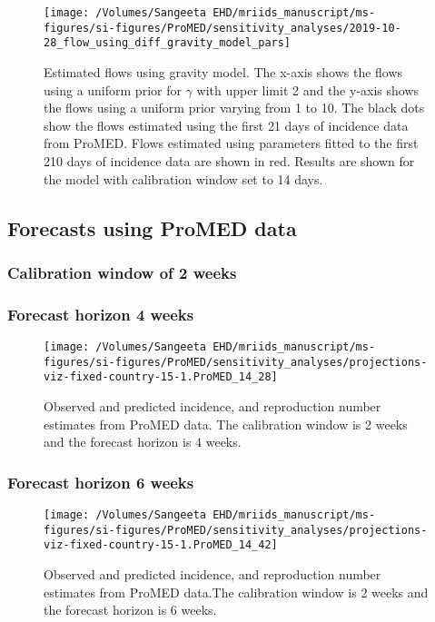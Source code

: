 \documentclass[9pt,twoside,lineno]{pnas-new}
\begin{document}
\begin{figure}
\centering
   \texttt{[image: /Volumes/Sangeeta
     EHD/mriids\_manuscript/ms-figures/si-figures/ProMED/sensitivity\_analyses/2019-10-28\_flow\_using\_diff\_gravity\_model\_pars]}
\caption{Estimated flows using gravity model. The x-axis shows the flows using a uniform
  prior for $\gamma$ with upper limit 2 and the y-axis shows the flows
  using a uniform prior varying from 1 to 10. The black dots show the
  flows estimated using the first 21 days of incidence data from ProMED. Flows
  estimated using parameters fitted to the first 210 days of incidence
  data are shown in red. Results are shown for the model with
  calibration window set to 14 days.}
\label{fig:flows2}
\end{figure}\FloatBarrier

\subsection{Forecasts using ProMED data}\label{forecasts-using-promed-data-1}
\subsubsection{Calibration window of 2 weeks}\label{sec:pm2-3-2}
\subsubsection{Forecast horizon 4 weeks}\label{forecast-horizon-4-weeks-8}

\begin{figure}
  \centering 
\texttt{[image: /Volumes/Sangeeta EHD/mriids\_manuscript/ms-figures/si-figures/ProMED/sensitivity\_analyses/projections-viz-fixed-country-15-1.ProMED\_14\_28]} 
  \caption{Observed and predicted incidence, and reproduction number
estimates from ProMED data. The calibration window is 2 weeks and the
forecast horizon is 4 weeks.}
\label{fig:pm24ul10}
\end{figure}\FloatBarrier


\subsubsection{Forecast horizon 6 weeks}\label{forecast-horizon-6-weeks-9}

\begin{figure}

  \centering \texttt{[image: /Volumes/Sangeeta EHD/mriids\_manuscript/ms-figures/si-figures/ProMED/sensitivity\_analyses/projections-viz-fixed-country-15-1.ProMED\_14\_42]} 

  \caption{Observed and predicted incidence, and reproduction number
    estimates from ProMED data.The calibration window is 2 weeks and
    the forecast horizon is 6 weeks.}
  \label{fig:pm26ul10}
\end{figure}\FloatBarrier
\end{document}
